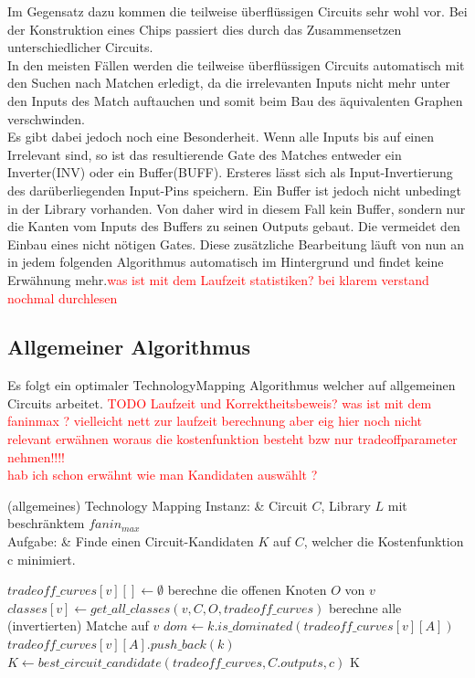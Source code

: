 \documentclass[11pt, a4paper, german]{article}
\newcommand{\TM}{TechnologyMapping }
\begin{document}
Im Gegensatz dazu kommen die teilweise überflüssigen Circuits sehr wohl vor. Bei der Konstruktion eines Chips passiert dies durch das Zusammensetzen unterschiedlicher Circuits.\\
In den meisten Fällen werden die teilweise überflüssigen Circuits automatisch mit den Suchen nach Matchen erledigt, da die irrelevanten Inputs nicht mehr unter den Inputs des Match auftauchen und somit beim Bau des äquivalenten Graphen verschwinden. \\
Es gibt dabei jedoch noch eine Besonderheit. Wenn alle Inputs bis auf einen Irrelevant sind, so ist das resultierende Gate des Matches entweder ein Inverter(INV) oder ein Buffer(BUFF). Ersteres lässt sich als Input-Invertierung des darüberliegenden Input-Pins speichern. Ein Buffer ist jedoch nicht unbedingt in der Library vorhanden. Von daher wird in diesem Fall kein Buffer, sondern nur die Kanten vom Inputs des Buffers zu seinen Outputs gebaut. Die vermeidet den Einbau eines nicht nötigen Gates. Diese zusätzliche Bearbeitung läuft von nun an in jedem folgenden Algorithmus automatisch im Hintergrund und findet keine Erwähnung mehr.\textcolor{red}{was ist mit dem Laufzeit statistiken?}
 \textcolor{red}{bei klarem verstand nochmal durchlesen}
 
 \subsection{Allgemeiner Algorithmus}
 Es folgt ein optimaler  \TM Algorithmus welcher auf allgemeinen Circuits arbeitet. 
 \textcolor{red}{TODO Laufzeit  und Korrektheitsbeweis? was ist mit dem faninmax ? vielleicht nett zur laufzeit berechnung aber eig hier noch nicht relevant   erwähnen woraus die kostenfunktion besteht bzw nur tradeoffparameter nehmen!!!!}\\
 \textcolor{red}{hab ich schon erwähnt wie man Kandidaten auswählt ?}
 
 \begin{problem}[framed]{(allgemeines) Technology Mapping}
  Instanz:  & Circuit $C$, Library $L$ mit beschr\"anktem $fanin_{max}$\\
  Aufgabe: &  Finde einen Circuit-Kandidaten $K$ auf $C$, welcher die Kostenfunktion c minimiert.
\end{problem}

\begin{algorithm}[H]
 \LinesNumbered
 \DontPrintSemicolon
 \caption{(allgemeines) \TM}
 {
 	$tradeoff\_curves[v][] \gets \emptyset$ \;
 	berechne die offenen Knoten $O$ von $v$\; 
 	$classes[v] \gets get\_all\_classes(v,C,  O, tradeoff\_curves)$\;
 	berechne alle (invertierten) Matche auf $v$\;
  	 {
   		{
   				{
   					$ dom \gets k.is\_dominated(tradeoff\_curves[v][A])$\;
						{$tradeoff\_curves[v][A].push\_back(k)$}
   				}
   		}
   	}
 }
 $K \gets best\_circuit\_candidate(tradeoff\_curves, C.outputs, c)$\;
\Return K
\end{algorithm}\ \\
 
\end{document}
